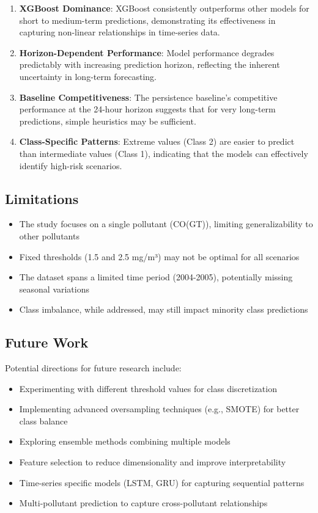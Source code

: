 \documentclass[12pt,a4paper]{article}
\begin{document}
\begin{enumerate}
    \item \textbf{XGBoost Dominance}: XGBoost consistently outperforms other models for short to medium-term predictions, demonstrating its effectiveness in capturing non-linear relationships in time-series data.
    
    \item \textbf{Horizon-Dependent Performance}: Model performance degrades predictably with increasing prediction horizon, reflecting the inherent uncertainty in long-term forecasting.
    
    \item \textbf{Baseline Competitiveness}: The persistence baseline's competitive performance at the 24-hour horizon suggests that for very long-term predictions, simple heuristics may be sufficient.
    
    \item \textbf{Class-Specific Patterns}: Extreme values (Class 2) are easier to predict than intermediate values (Class 1), indicating that the models can effectively identify high-risk scenarios.
\end{enumerate}

\subsection{Limitations}

\begin{itemize}
    \item The study focuses on a single pollutant (CO(GT)), limiting generalizability to other pollutants
    \item Fixed thresholds (1.5 and 2.5 mg/m³) may not be optimal for all scenarios
    \item The dataset spans a limited time period (2004-2005), potentially missing seasonal variations
    \item Class imbalance, while addressed, may still impact minority class predictions
\end{itemize}

\subsection{Future Work}

Potential directions for future research include:

\begin{itemize}
    \item Experimenting with different threshold values for class discretization
    \item Implementing advanced oversampling techniques (e.g., SMOTE) for better class balance
    \item Exploring ensemble methods combining multiple models
    \item Feature selection to reduce dimensionality and improve interpretability
    \item Time-series specific models (LSTM, GRU) for capturing sequential patterns
    \item Multi-pollutant prediction to capture cross-pollutant relationships
\end{itemize}
\end{document}
